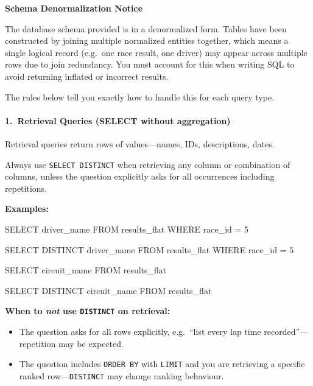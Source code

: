 \begin{tcolorbox}[
  colback=gray!5,
  colframe=gray!20,
  arc=4pt,
  boxrule=0.5pt,
  breakable,
  left=8pt,
  right=8pt,
  top=8pt,
  bottom=8pt,
  nobeforeafter,
]
{\bfseries Schema Denormalization Notice}\par\medskip

The database schema provided is in a denormalized form.
Tables have been constructed by joining multiple normalized entities together, which means a single logical record (e.g.\ one race result, one driver) may appear across multiple rows due to join redundancy.
You must account for this when writing SQL to avoid returning inflated or incorrect results.

The rules below tell you exactly how to handle this for each query type.

\tcbline
\paragraph{1.\ Retrieval Queries (SELECT without aggregation)}
Retrieval queries return rows of values---names, IDs, descriptions, dates.

\denormrule Always use \texttt{SELECT DISTINCT} when retrieving any column or combination of columns, unless the question explicitly asks for all occurrences including repetitions.

\noindent\textbf{Examples:}

\begin{sqlwrong}
SELECT driver_name FROM results_flat WHERE race_id = 5
\end{sqlwrong}
\begin{sqlcorrect}
SELECT DISTINCT driver_name FROM results_flat WHERE race_id = 5
\end{sqlcorrect}

\begin{sqlwrong}
SELECT circuit_name FROM results_flat
\end{sqlwrong}
\begin{sqlcorrect}
SELECT DISTINCT circuit_name FROM results_flat
\end{sqlcorrect}

\noindent\textbf{When to \emph{not} use \texttt{DISTINCT} on retrieval:}
\begin{itemize}
  \item The question asks for all rows explicitly, e.g.\ ``list every lap time recorded''---repetition may be expected.
  \item The question includes \texttt{ORDER BY} with \texttt{LIMIT} and you are retrieving a specific ranked row---\texttt{DISTINCT} may change ranking behaviour.
\end{itemize}


\end{tcolorbox}
